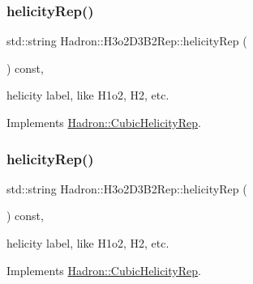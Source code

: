\mbox{\label{structHadron_1_1H3o2D3B2Rep_aba53f298e71b3e22d5828f164c2127cc}} 
\subsubsection{\texorpdfstring{helicityRep()}{helicityRep()}\hspace{0.1cm}{\footnotesize\ttfamily [1/2]}}
{\footnotesize\ttfamily std\+::string Hadron\+::\+H3o2\+D3\+B2\+Rep\+::helicity\+Rep (\begin{DoxyParamCaption}{ }\end{DoxyParamCaption}) const\hspace{0.3cm}{\ttfamily [inline]}, {\ttfamily [virtual]}}

helicity label, like H1o2, H2, etc. 

Implements \mbox{\hyperlink{structHadron_1_1CubicHelicityRep_af1096946b7470edf0a55451cc662f231}{Hadron\+::\+Cubic\+Helicity\+Rep}}.

\mbox{\label{structHadron_1_1H3o2D3B2Rep_aba53f298e71b3e22d5828f164c2127cc}} 
\subsubsection{\texorpdfstring{helicityRep()}{helicityRep()}\hspace{0.1cm}{\footnotesize\ttfamily [2/2]}}
{\footnotesize\ttfamily std\+::string Hadron\+::\+H3o2\+D3\+B2\+Rep\+::helicity\+Rep (\begin{DoxyParamCaption}{ }\end{DoxyParamCaption}) const\hspace{0.3cm}{\ttfamily [inline]}, {\ttfamily [virtual]}}

helicity label, like H1o2, H2, etc. 

Implements \mbox{\hyperlink{structHadron_1_1CubicHelicityRep_af1096946b7470edf0a55451cc662f231}{Hadron\+::\+Cubic\+Helicity\+Rep}}.

\mbox{\label{structHadron_1_1H3o2D3B2Rep_a7b7bbc5fa5a2e13412b53abb425dc0fd}} 
